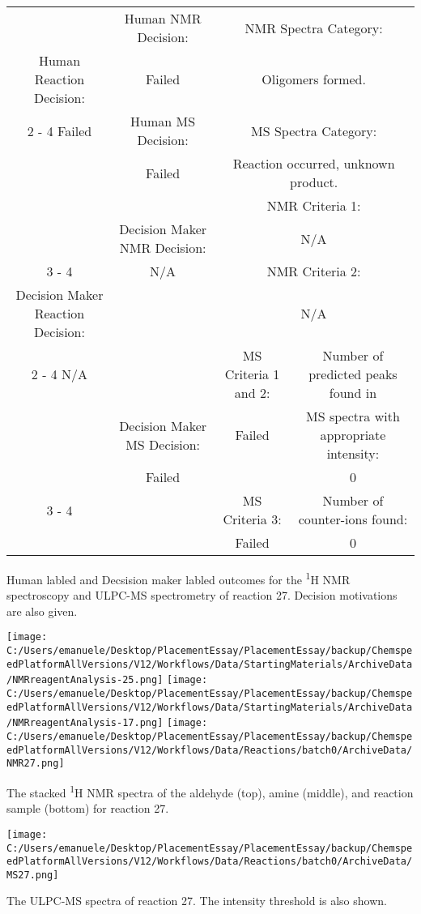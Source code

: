 \documentclass{article}%
\begin{document}
\begin{Decision Table}[H]%
\begin{tabular}{|c|c|c|c|}%
\hline%
&Human NMR Decision:&\multicolumn{2}{|c|}{NMR Spectra Category:}\\%
Human Reaction Decision:&Failed&\multicolumn{2}{|c|}{Oligomers formed.}\\%
\cline{2%
-%
4}%
Failed&Human MS Decision:&\multicolumn{2}{|c|}{MS Spectra Category:}\\%
&Failed&\multicolumn{2}{|c|}{Reaction occurred, unknown product.}\\%
\hline%
&&\multicolumn{2}{|c|}{NMR Criteria 1:}\\%
&Decision Maker NMR Decision:&\multicolumn{2}{|c|}{N/A}\\%
\cline{3%
-%
4}%
&N/A&\multicolumn{2}{|c|}{NMR Criteria 2:}\\%
Decision Maker Reaction Decision:&&\multicolumn{2}{|c|}{N/A}\\%
\cline{2%
-%
4}%
N/A&&MS Criteria 1 and 2:&Number of predicted peaks found in\\%
&Decision Maker MS Decision:&Failed&MS spectra with appropriate intensity:\\%
&Failed&&0\\%
\cline{3%
-%
4}%
&&MS Criteria 3:&Number of counter{-}ions found:\\%
&&Failed&0\\%
\hline%
\end{tabular}%
\caption{Human labled and Decsision maker labled outcomes for the \textsuperscript{1}H NMR spectroscopy and ULPC-MS spectrometry of reaction 27. Decision motivations are also given.}%
\end{Decision Table}%
\begin{NMR Spectra}[H]%
\begin{center}%
\texttt{[image: C:/Users/emanuele/Desktop/PlacementEssay/PlacementEssay/backup/ChemspeedPlatformAllVersions/V12/Workflows/Data/StartingMaterials/ArchiveData/NMRreagentAnalysis-25.png]}\hfill%
\texttt{[image: C:/Users/emanuele/Desktop/PlacementEssay/PlacementEssay/backup/ChemspeedPlatformAllVersions/V12/Workflows/Data/StartingMaterials/ArchiveData/NMRreagentAnalysis-17.png]}\hfill%
\texttt{[image: C:/Users/emanuele/Desktop/PlacementEssay/PlacementEssay/backup/ChemspeedPlatformAllVersions/V12/Workflows/Data/Reactions/batch0/ArchiveData/NMR27.png]}\hfill%
\end{center}%
\caption{The stacked \textsuperscript{1}H NMR spectra of the aldehyde (top), amine (middle), and reaction sample (bottom) for reaction 27.}%
\end{NMR Spectra}%
\begin{MS Spectra}[H]%
\begin{center}%
\texttt{[image: C:/Users/emanuele/Desktop/PlacementEssay/PlacementEssay/backup/ChemspeedPlatformAllVersions/V12/Workflows/Data/Reactions/batch0/ArchiveData/MS27.png]}\hfill%
\end{center}%
\caption{The ULPC-MS spectra of reaction 27. The intensity threshold is also shown.}%
\end{MS Spectra}%
\end{document}
